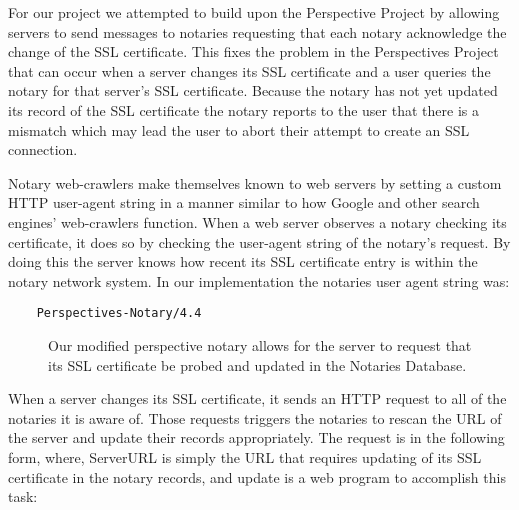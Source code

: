 \documentclass[preprint,review,12pt]{elsarticle}
\begin{document}
For our project we attempted to build upon the Perspective Project by allowing
servers to send messages to notaries requesting that each notary acknowledge
the change of the SSL certificate. This fixes the problem in the Perspectives
Project that can occur when a server changes its SSL certificate and a user
queries the notary for that server's SSL certificate. Because the notary has
not yet updated its record of the SSL certificate the notary reports to the
user that there is a mismatch which may lead the user to abort their attempt to
create an SSL connection.

Notary web-crawlers make themselves known to web servers by setting a custom
HTTP user-agent string in a manner similar to how Google and other search
engines' web-crawlers function. When a web server observes a notary checking
its certificate, it does so by checking the user-agent string of the notary's
request.  By doing this the server knows how recent its SSL certificate entry
is within the notary network system.  In our implementation the notaries user
agent string was:

\begin{verbatim}
    Perspectives-Notary/4.4
\end{verbatim}

\begin{figure}[h]
\caption{Our modified perspective notary allows for the server to request that
    its SSL certificate be probed and updated in the Notaries Database.}
\end{figure}

When a server changes its SSL certificate, it sends an HTTP request to all of
the notaries it is aware of.  Those requests triggers the notaries to rescan
the URL of the server and update their records appropriately. The request is in
the following form, where, ServerURL is simply the URL that requires updating
of its SSL certificate in the notary records, and update is a web program to
accomplish this task:
\end{document}
